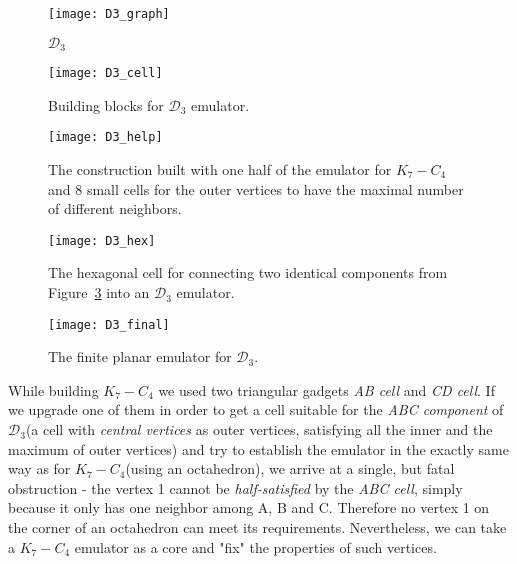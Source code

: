 \documentclass[envcountsect,envcountsame]{llncs}
\renewenvironment{accumulate}{}{}
\newcommand{\KK}{\ensuremath{{K}_7 - C_4}\xspace}
\newcommand{\DD}{\ensuremath{\mathcal{D}_3}\xspace}
\begin{document}
\begin{accumulate}
\begin{figure}[htbp]\centering
\texttt{[image: D3\_graph]}
\caption{\DD}
\label{fig:D3}
\end{figure}

\begin{figure}[htbp]\centering
\texttt{[image: D3\_cell]}
\caption{Building blocks for \DD emulator.}
\label{fig:D3_cells}
\end{figure}

\begin{figure}[htbp]
\centering
\texttt{[image: D3\_help]}
\caption{The construction built with one half of the emulator for \KK and 8 small cells for the outer vertices to have the maximal number of different
neighbors.}
\label{fig:D3_help}
\end{figure}

\begin{figure}[htbp]
\centering\smallskip
\texttt{[image: D3\_hex]}
\caption{The hexagonal cell for connecting two identical components from  Figure~\ref{fig:D3_help} into an
\DD emulator.}
\label{fig:D3_hex}
\end{figure}

\begin{figure}[htbp]
\texttt{[image: D3\_final]}
\caption{The finite planar emulator for \DD.}
\label{fig:D3_final}
\end{figure}


While building \KK we used two triangular gadgets \textit{AB cell} and
\textit{CD cell}.  If we upgrade one of them in order to get a cell suitable
for the \textit{ABC component} of \DD (a cell with \textit{central vertices} as
outer vertices, satisfying all the inner and the maximum of outer vertices)
and try to establish the emulator in the exactly same way as for \KK (using
an octahedron), we arrive at a single, but fatal obstruction - the vertex 1
cannot be \textit{half-satisfied} by the \textit{ABC cell}, simply because it only has one neighbor among A, B and C.  Therefore no vertex 1 on
the corner of an octahedron can meet its requirements.  Nevertheless, we can
take a \KK emulator as a core and "fix" the properties of such vertices.


\end{accumulate}
\end{document}
